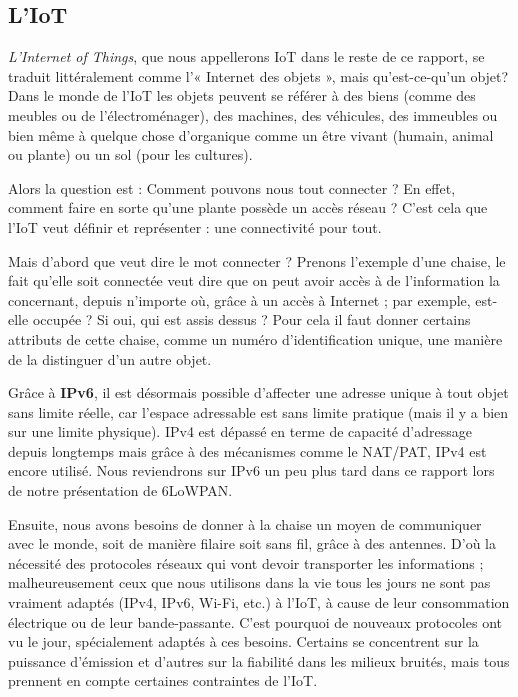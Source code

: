 
\subsection{L'IoT}

\textit{L'Internet of Things}, que nous appellerons IoT dans le reste de ce rapport, se traduit littéralement comme l'« Internet des objets », mais qu'est-ce-qu'un objet? Dans le monde de l'IoT les objets peuvent se référer à des biens (comme des meubles ou de l'électroménager), des machines, des véhicules, des immeubles ou bien même à quelque chose d'organique comme un être vivant (humain, animal ou plante) ou un sol (pour les cultures).

Alors la question est : Comment pouvons nous tout connecter ? En effet, comment faire en sorte qu'une plante possède un accès réseau ? C'est cela que l'IoT veut définir et représenter : une connectivité pour tout.

Mais d'abord que veut dire le mot connecter ? Prenons l'exemple d'une chaise, le fait qu'elle soit connectée veut dire que on peut avoir accès à de l'information la concernant, depuis n'importe où, grâce à un accès à Internet ; par exemple, est-elle occupée ? Si oui, qui est assis dessus ? Pour cela il faut donner certains attributs de cette chaise, comme un numéro d'identification unique, une manière de la distinguer d'un autre objet. 

Grâce à \textbf{IPv6}, il est désormais possible d’affecter une adresse unique à tout objet sans limite réelle, car l'espace adressable est sans limite pratique (mais il y a bien sur une limite physique). IPv4 est dépassé en terme de capacité d'adressage depuis longtemps mais grâce à des mécanismes comme le NAT/PAT, IPv4 est encore utilisé. Nous reviendrons sur IPv6 un peu plus tard dans ce rapport lors de notre présentation de 6LoWPAN.

Ensuite, nous avons besoins de donner à la chaise un moyen de communiquer avec le monde, soit de manière filaire soit sans fil, grâce à des antennes. D'où la nécessité des protocoles réseaux qui vont devoir transporter les informations ; malheureusement ceux que nous utilisons dans la vie tous les jours ne sont pas vraiment adaptés (IPv4, IPv6, Wi-Fi, etc.) à l'IoT, à cause de leur consommation électrique ou de leur bande-passante. C'est pourquoi de nouveaux protocoles ont vu le jour, spécialement adaptés à ces besoins. Certains se concentrent sur la puissance d'émission et d'autres sur la fiabilité dans les milieux bruités, mais tous prennent en compte certaines contraintes de l'IoT.

